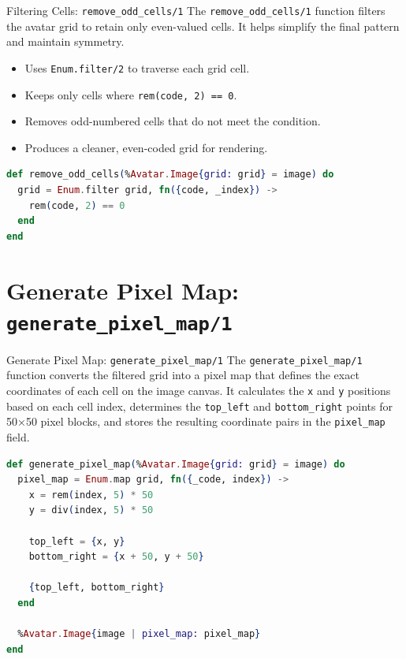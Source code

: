 \documentclass[aspectratio=169, table]{beamer}
\begin{document}
\begin{frame}[fragile]{Filtering Cells: \texttt{remove\_odd\_cells/1}}
\vspace{20pt}
\small
The \texttt{remove\_odd\_cells/1} function filters the avatar grid to retain only even-valued cells.  
It helps simplify the final pattern and maintain symmetry.  

\begin{itemize}
  \item Uses \texttt{Enum.filter/2} to traverse each grid cell.
  \item Keeps only cells where \texttt{rem(code, 2) == 0}.
  \item Removes odd-numbered cells that do not meet the condition.
  \item Produces a cleaner, even-coded grid for rendering.
\end{itemize}

\begin{lstlisting}[language=Elixir]
def remove_odd_cells(%Avatar.Image{grid: grid} = image) do
  grid = Enum.filter grid, fn({code, _index}) ->
    rem(code, 2) == 0
  end
end
\end{lstlisting}
\end{frame}

\section{Generate Pixel Map: \texttt{generate\_pixel\_map/1}}

\begin{frame}[fragile]{Generate Pixel Map: \texttt{generate\_pixel\_map/1}}
\vspace{20pt}
\small
The \texttt{generate\_pixel\_map/1} function converts the filtered grid into a pixel map that defines  
the exact coordinates of each cell on the image canvas. It calculates the \texttt{x} and \texttt{y}  
positions based on each cell index, determines the \texttt{top\_left} and \texttt{bottom\_right}  
points for 50×50 pixel blocks, and stores the resulting coordinate pairs in the \texttt{pixel\_map} field.

\begin{lstlisting}[language=Elixir, basicstyle=\ttfamily\scriptsize]
def generate_pixel_map(%Avatar.Image{grid: grid} = image) do
  pixel_map = Enum.map grid, fn({_code, index}) ->
    x = rem(index, 5) * 50
    y = div(index, 5) * 50

    top_left = {x, y}
    bottom_right = {x + 50, y + 50}

    {top_left, bottom_right}
  end

  %Avatar.Image{image | pixel_map: pixel_map}
end
\end{lstlisting}
\end{frame}
\end{document}
